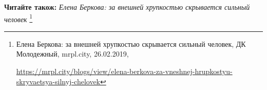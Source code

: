  
 
 
 
 


\textbf{Читайте також:} \emph{Елена Беркова: за внешней хрупкостью скрывается сильный человек}%
\footnote{Елена Беркова: за внешней хрупкостью скрывается сильный человек, ДК Молодежный, mrpl.city, 26.02.2019, \par%
\url{https://mrpl.city/blogs/view/elena-berkova-za-vneshnej-hrupkostyu-skryvaetsya-silnyj-chelovek}
}
